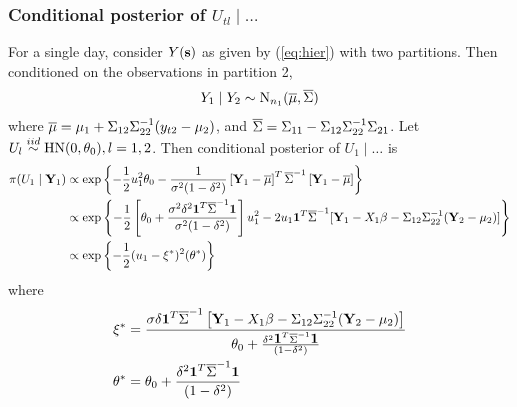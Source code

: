 \subsubsection*{Conditional posterior of $U_{tl} \mid \ldots $}\label{s:mvcondu}
For a single day, consider $Y(\mbox{\bf s})$ as given by (\ref{eq:hier}) with two partitions.
Then conditioned on the observations in partition 2,  
\begin{align}
  Y_{1} \mid Y_{2} \sim \mbox{N}_{n_1} (\overline{\mu}, \overline{\Sigma})
\end{align}
where $\overline{\mu} = \mu_1 + \Sigma_{12} \Sigma_{22}^{-1}(y_{t2} - \mu_{2})$, and $\overline{\Sigma} = \Sigma_{11} - \Sigma_{12} \Sigma_{22}^{-1}\Sigma_{21}$. 
Let $U_{l} \stackrel{iid}{\sim} \mbox{HN}(0, \theta_0), l = 1, 2$.
Then conditional posterior of $U_{1} \mid \ldots $ is
\begin{align}
  \pi(U_{1} \mid \mbox{\bf Y}_{1}) & \propto \exp \left\{ -\frac{ 1 }{ 2 } u_1^2 \theta_0 - \frac{ 1 }{ \sigma^2 (1 - \delta^2 ) } \left[ \mbox{\bf Y}_{1} - \overline{\mu} \right]^T \overline{\Sigma}^{-1} \left[ \mbox{\bf Y}_{1} - \overline{\mu} \right] \right\}\\
  & \propto \exp \left\{ - \frac{1}{2} \left[ \theta_0 + \frac{ \sigma^2 \delta^2 \mbox{\boldmath $1$}^T \overline{\Sigma}^{-1} \mbox{\boldmath $1$} }{ \sigma^2 (1 - \delta^2) } \right] u_1^2  - 2u_1\mbox{\boldmath $1$}^T \overline{\Sigma}^{-1} [\mbox{\bf Y}_{1} - X_{1}\beta - \Sigma_{12} \Sigma_{22}^{-1} (\mbox{\bf Y}_{2} - \mu_2)] \right\}\\
  & \propto \exp \left \{ -\frac{ 1 }{ 2 } (u_1 - \xi^*)^2 (\theta^*) \right \}
\end{align}
where
\begin{align}
  \xi^* &= \frac{ \sigma \delta \mbox{\boldmath $1$}^T \overline{\Sigma}^{-1}\left[ \mbox{\bf Y}_{1} - X_{1}\beta - \Sigma_{12} \Sigma_{22}^{-1} (\mbox{\bf Y}_2 - \mu_2)\right]}{\theta_0 + \frac{ \delta^2 \mbox{\boldmath $1$}^T \overline{\Sigma}^{-1} \mbox{\boldmath $1$}}{(1 - \delta^2)}}\\
  \theta^* &= \theta_0 + \frac{ \delta^2 \mbox{\boldmath $1$}^T \overline{\Sigma}^{-1} \mbox{\boldmath $1$} }{ (1 - \delta^2 )}
\end{align}


